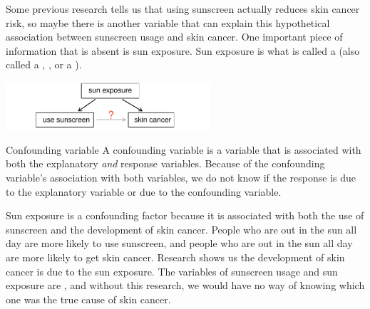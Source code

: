 Some previous research tells us that using sunscreen actually reduces skin cancer risk, so maybe there is another variable that can explain this hypothetical association between sunscreen usage and skin cancer. One important piece of information that is absent is sun exposure. Sun exposure is what is called a  (also called a , , or a ).
\begin{center}
\includegraphics[width=0.57\textwidth]{ch_data_collection/figures/variables/sunCausesCancer}
\end{center}



\begin{onebox}{Confounding variable}
A confounding variable is a variable that is associated with both the explanatory \emph{and} response variables. Because of the confounding variable's association with both variables, we do not know if the response is due to the explanatory variable or due to the confounding variable.\end{onebox}

Sun exposure is a confounding factor because it is associated with both the use of sunscreen and the development of skin cancer. People who are out in the sun all day are more likely to use sunscreen, and people who are out in the sun all day are more likely to get skin cancer. Research shows us the development of skin cancer is due to the sun exposure. The variables of sunscreen usage and sun exposure are , and without this research, we would have no way of knowing which one was the true cause of skin cancer.

